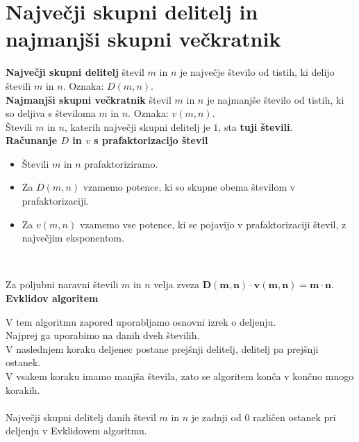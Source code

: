     

\newpage

\section{Največji skupni delitelj in najmanjši skupni večkratnik}

        

                \textbf{Največji skupni delitelj} števil $m$ in $n$ je največje število od tistih, ki delijo števili $m$ in $n$. 
                Oznaka: $D(m,n)$.           
                \\

                \textbf{Najmanjši skupni večkratnik} števil $m$ in $n$ je najmanjše število od tistih, ki so deljiva s številoma $m$ in $n$. 
                Oznaka: $v(m,n)$.
                \\

            
                Števili $m$ in $n$, katerih največji skupni delitelj je $1$, sta \textbf{tuji števili}.
                \\
        

        
            \textbf{Računanje $D$ in $v$ s prafaktorizacijo števil}
                \begin{itemize}
                    \item Števili $m$ in $n$ prafaktoriziramo.
                    \item Za $D(m,n)$ vzamemo potence, ki so skupne obema številom v prafaktorizaciji.
                    \item Za $v(m,n)$ vzamemo vse potence, ki se pojavijo v prafaktorizaciji števil, z največjim eksponentom.
                \end{itemize}                
            ~

            
                Za poljubni naravni števili $m$ in $n$ velja zveza $\mathbf{D(m,n)\cdot v(m,n)=m\cdot n}$.
            \\

            \textbf{Evklidov algoritem}

                V tem algoritmu zapored uporabljamo osnovni izrek o deljenju. 
                \\ Najprej ga uporabimo na danih dveh številih.
                \\ V naslednjem koraku deljenec postane prejšnji delitelj, delitelj pa prejšnji ostanek. 
                \\ V vsakem koraku imamo manjša števila, zato se algoritem konča v končno mnogo korakih.
                \\ ~\\ Največji skupni delitelj danih števil $m$ in $n$ je zadnji od $0$ različen ostanek pri deljenju v Evklidovem algoritmu.
            

